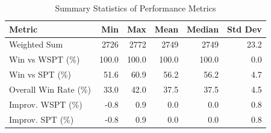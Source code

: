 \begin{table}[htbp]%
\centering%
\begin{tabular}{lrrrrr}%
\toprule%
\textbf{Metric}&\textbf{Min}&\textbf{Max}&\textbf{Mean}&\textbf{Median}&\textbf{Std Dev}\\%
\midrule%
Weighted Sum&2726&2772&2749&2749&23.2\\%
Win vs WSPT (\%)&100.0&100.0&100.0&100.0&0.0\\%
Win vs SPT (\%)&51.6&60.9&56.2&56.2&4.7\\%
Overall Win Rate (\%)&33.0&42.0&37.5&37.5&4.5\\%
Improv. WSPT (\%)&-0.8&0.9&0.0&0.0&0.8\\%
Improv. SPT (\%)&-0.8&0.9&0.0&0.0&0.8\\%
\bottomrule%
\end{tabular}%
\caption{Summary Statistics of Performance Metrics}%
\label{tab:metrics}%
\end{table}